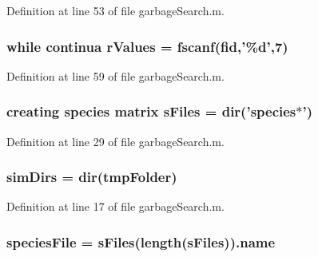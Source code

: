 Definition at line 53 of file garbage\-Search.\-m.

\hypertarget{a00027_a436a6968124e560649654a4abbd9dac6}{
\subsubsection[{r\-Values}]{\setlength{\rightskip}{0pt plus 5cm}while {\bf continua} r\-Values = {\bf fscanf}({\bf fid},'\%d',7)}}\label{a00027_a436a6968124e560649654a4abbd9dac6}


Definition at line 59 of file garbage\-Search.\-m.

\hypertarget{a00027_a0cf551ea63e8b67362ae2ab776072d1f}{
\subsubsection[{s\-Files}]{\setlength{\rightskip}{0pt plus 5cm}creating {\bf species} matrix s\-Files = dir('{\bf species}$\ast$')}}\label{a00027_a0cf551ea63e8b67362ae2ab776072d1f}


Definition at line 29 of file garbage\-Search.\-m.

\hypertarget{a00027_aae5035eb84b89176ed5b06e136325eff}{
\subsubsection[{sim\-Dirs}]{\setlength{\rightskip}{0pt plus 5cm}sim\-Dirs = dir({\bf tmp\-Folder})}}\label{a00027_aae5035eb84b89176ed5b06e136325eff}


Definition at line 17 of file garbage\-Search.\-m.

\hypertarget{a00027_a7da0c82834970c5f3c3d9224ab832577}{
\subsubsection[{species\-File}]{\setlength{\rightskip}{0pt plus 5cm}species\-File = {\bf s\-Files}(length({\bf s\-Files})).{\bf name}}}\label{a00027_a7da0c82834970c5f3c3d9224ab832577}


